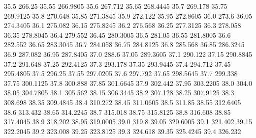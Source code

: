            35.5           266.25
          35.55         266.9805
           35.6          267.712
          35.65         268.4445
           35.7          269.178
          35.75         269.9125
           35.8          270.648
          35.85         271.3845
           35.9          272.122
          35.95         272.8605
           36.0            273.6
          36.05         274.3405
           36.1          275.082
          36.15         275.8245
           36.2          276.568
          36.25         277.3125
           36.3          278.058
          36.35         278.8045
           36.4          279.552
          36.45         280.3005
           36.5           281.05
          36.55         281.8005
           36.6          282.552
          36.65         283.3045
           36.7          284.058
          36.75         284.8125
           36.8          285.568
          36.85         286.3245
           36.9          287.082
          36.95         287.8405
           37.0            288.6
          37.05         289.3605
           37.1          290.122
          37.15         290.8845
           37.2          291.648
          37.25         292.4125
           37.3          293.178
          37.35         293.9445
           37.4          294.712
          37.45         295.4805
           37.5           296.25
          37.55         297.0205
           37.6          297.792
          37.65         298.5645
           37.7          299.338
          37.75         300.1125
           37.8          300.888
          37.85         301.6645
           37.9          302.442
          37.95         303.2205
           38.0            304.0
          38.05         304.7805
           38.1          305.562
          38.15         306.3445
           38.2          307.128
          38.25         307.9125
           38.3          308.698
          38.35         309.4845
           38.4          310.272
          38.45         311.0605
           38.5           311.85
          38.55         312.6405
           38.6          313.432
          38.65         314.2245
           38.7          315.018
          38.75         315.8125
           38.8          316.608
          38.85         317.4045
           38.9          318.202
          38.95         319.0005
           39.0            319.8
          39.05         320.6005
           39.1          321.402
          39.15         322.2045
           39.2          323.008
          39.25         323.8125
           39.3          324.618
          39.35         325.4245
           39.4          326.232
